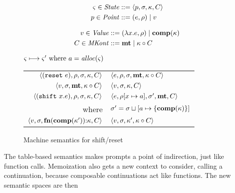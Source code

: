 \begin{center}
  \begin{minipage}{0.45\linewidth}
    \begin{align*}
      \varsigma \in \mathit{State} &::= \langle p, \sigma, \kappa, C \rangle \\
      p \in \mathit{Point} &::= (e, \rho) \mathrel{\mid} v
    \end{align*}
  \end{minipage}
  \begin{minipage}{0.50\linewidth}
    \begin{align*}
      v \in \mathit{Value} &::= (\lambda{} x. e, \rho) \mathrel{\mid} \mathbf{comp}(\kappa) \\
      C \in \mathit{MKont} &::= \mathbf{mt} \mathrel{\mid} \kappa\circ C
    \end{align*}
  \end{minipage}
\end{center}
\begin{figure}
  \centering
  $\varsigma \longmapsto \varsigma' \text{ where } a = \mathit{alloc}(\varsigma)$ \\
  \begin{tabular}{r|l}%
    \hline
    $\langle (\texttt{reset}\ e), \rho, \sigma, \kappa, C \rangle$
    &
    $\langle e, \rho, \sigma, \mathbf{mt}, \kappa\circ C \rangle$
    \\
    $\langle v, \sigma, \mathbf{mt}, \kappa\circ C \rangle$
    &
    $\langle v, \sigma, {\kappa}, {C} \rangle$
    \\
    $\langle (\texttt{shift}\ x. e), \rho, \sigma, \kappa, C \rangle$
    &
    $\langle e, \rho[x \mapsto a], \sigma',\mathbf{mt},C \rangle$
    \\ where & $\sigma' = \sigma\sqcup[a \mapsto \{ \mathbf{comp}(\kappa) \}]$
    \\
    $\langle v,\sigma,\mathbf{fn}{}(\mathbf{comp}(\kappa')){\tt :} \kappa, C \rangle$
    &
    $\langle v, \sigma, \kappa', \kappa\circ C \rangle$
  \end{tabular}  
  \caption{Machine semantics for shift/reset}
  \label{fig:shift-reset}
\end{figure}

The table-based semantics makes prompts a point of indirection, just like function calls.
%
Memoization also gets a new context to consider, calling a continuation, because composable continuations act like functions.
%
The new semantic spaces are then


